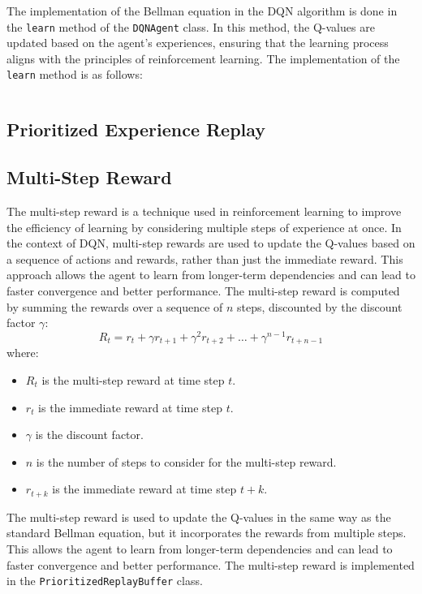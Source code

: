 The implementation of the Bellman equation in the DQN algorithm is done in the \texttt{learn} method of the \texttt{DQNAgent} class.
In this method, the Q-values are updated based on the agent's experiences, ensuring that the learning process aligns with the principles of reinforcement learning.
The implementation of the \texttt{learn} method is as follows:

\inputminted[firstline=135, highlightlines={152-159}]{python}{../dqn.py}

\subsection{Prioritized Experience Replay}
\label{sec:per}

\subsection{Multi-Step Reward}

The multi-step reward is a technique used in reinforcement learning to improve the efficiency of learning by considering multiple steps of experience at once.
In the context of DQN, multi-step rewards are used to update the Q-values based on a sequence of actions and rewards, rather than just the immediate reward.
This approach allows the agent to learn from longer-term dependencies and can lead to faster convergence and better performance.
The multi-step reward is computed by summing the rewards over a sequence of $n$ steps, discounted by the discount factor $\gamma$:
\begin{equation}
      R_t = r_t + \gamma r_{t+1} + \gamma^2 r_{t+2} + \ldots + \gamma^{n-1} r_{t+n-1}
\end{equation}
where:
\begin{itemize}
      \item $R_t$ is the multi-step reward at time step $t$.
      \item $r_t$ is the immediate reward at time step $t$.
      \item $\gamma$ is the discount factor.
      \item $n$ is the number of steps to consider for the multi-step reward.
      \item $r_{t+k}$ is the immediate reward at time step $t+k$.
\end{itemize}
The multi-step reward is used to update the Q-values in the same way as the standard Bellman equation, but it incorporates the rewards from multiple steps.
This allows the agent to learn from longer-term dependencies and can lead to faster convergence and better performance.
The multi-step reward is implemented in the \texttt{PrioritizedReplayBuffer} class.


